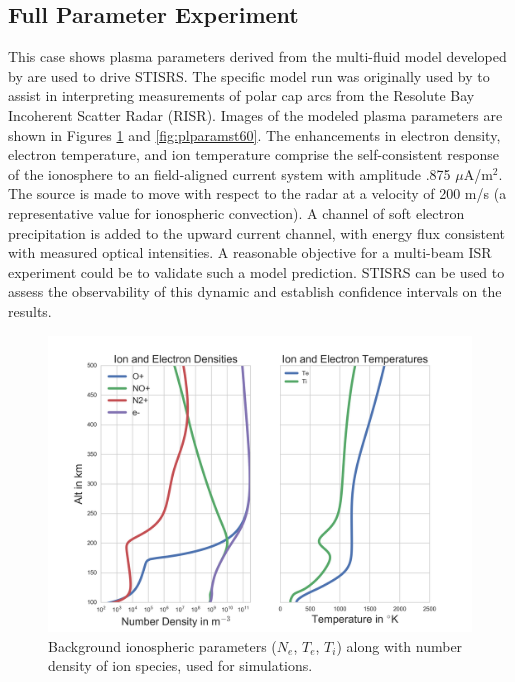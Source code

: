 \documentclass[draft,ras]{agutex}
\begin{document}
\begin{article}
\subsection{Full Parameter Experiment}
\label{sec:fullparam}
This case shows plasma parameters derived from the multi-fluid model developed by \cite{semeter:plasmatransport2012} are used to drive STISRS. The specific model run was originally used by \cite{Perry:2015jf} to assist in interpreting measurements of polar cap arcs from the Resolute Bay Incoherent Scatter Radar (RISR). Images of the modeled plasma parameters are shown in Figures \ref{fig:plparamst0} and \ref{fig:plparamst60}. The enhancements in electron density, electron temperature, and ion temperature comprise the self-consistent response of the ionosphere to an field-aligned current system with amplitude .875 $\mu$A/m$^2$.  The source is made to move with respect to the radar at a velocity of 200 m/s (a representative value for ionospheric convection).  A channel of soft electron precipitation is added to the upward current channel, with energy flux consistent with measured optical intensities.  A reasonable objective for a multi-beam ISR experiment could be to validate such a model prediction.  STISRS can be used to assess the observability of this dynamic and establish confidence intervals on the results.  

\begin{figure}[!t]
\centering
\includegraphics[width=6in]{backgroundallparams}
\caption{Background ionospheric parameters ($N_e$, $T_e$, $T_i$) along with number density of ion species, used for simulations.}
\label{fig:plparamst0}
\end{figure}


\end{article}
\end{document}
